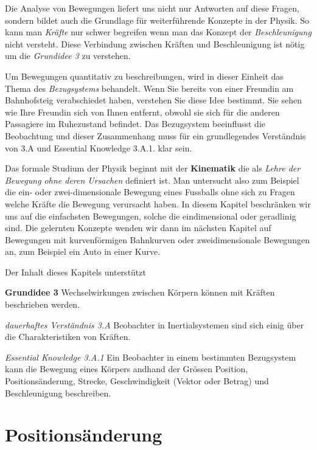 \documentclass[
]{book}
\begin{document}
Die Analyse von Bewegungen liefert uns nicht nur Antworten auf diese Fragen, sondern bildet auch die Grundlage für weiterführende Konzepte in der Physik. So kann man \emph{Kräfte} nur schwer begreifen wenn man das Konzept der \emph{Beschleunigung} nicht versteht. Diese Verbindung zwischen Kräften und Beschleunigung ist nötig um die \emph{Grundidee 3} zu verstehen.

Um Bewegungen quantitativ zu beschreibungen, wird in dieser Einheit das Thema des \emph{Bezugsystems} behandelt. Wenn Sie bereits von einer Freundin am Bahnhofsteig verabschiedet haben, verstehen Sie diese Idee bestimmt. Sie sehen wie Ihre Freundin sich von Ihnen entfernt, obwohl sie sich für die anderen Passagiere im Ruhezustand befindet. Das Bezugsystem beeinflusst die Beobachtung und dieser Zusammenhang muss für ein grundlegendes Verständnis von 3.A und Essential Knowledge 3.A.1. klar sein.

Das formale Studium der Physik beginnt mit der \textbf{Kinematik} die als \emph{Lehre der Bewegung ohne deren Ursachen} definiert ist. Man untersucht also zum Beispiel die ein- oder zwei-dimensionale Bewegung eines Fussballs ohne sich zu Fragen welche Kräfte die Bewegung verursacht haben. In diesem Kapitel beschränken wir uns auf die einfachsten Bewegungen, solche die eindimensional oder geradlinig sind. Die gelernten Konzepte wenden wir dann im nächsten Kapitel auf Bewegungen mit kurvenförmigen Bahnkurven oder zweidimensionale Bewegungen an, zum Beispiel ein Auto in einer Kurve.

Der Inhalt dieses Kapitels unterstützt

\textbf{Grundidee 3} Wechselwirkungen zwischen Körpern können mit Kräften beschrieben werden.

\emph{dauerhaftes Verständnis 3.A} Beobachter in Inertialsystemen sind sich einig über die Charakteristiken von Kräften.

\emph{Essential Knowledge 3.A.1} Ein Beobachter in einem bestimmten Bezugsystem kann die Bewegung eines Körpers andhand der Grössen Position, Positionsänderung, Strecke, Geschwindigkeit (Vektor oder Betrag) und Beschleunigung beschreiben.

\hypertarget{concept-trailer-1d-kinematics}{}

\hypertarget{positionsuxe4nderung}{%
\section{Positionsänderung}\label{positionsuxe4nderung}}
\end{document}
